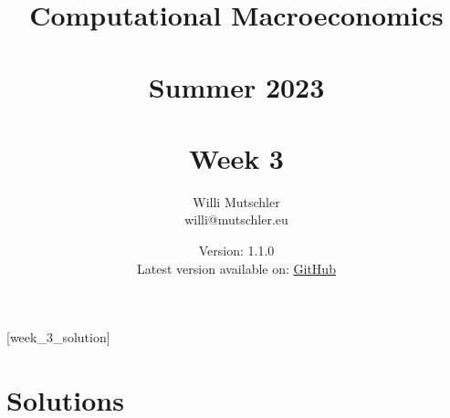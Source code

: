 
\newif\ifDisplaySolutions\DisplaySolutionstrue


\title{Computational Macroeconomics\\~\\Summer 2023\\~\\Week 3}
\author{Willi Mutschler\\willi@mutschler.eu}
\date{Version: 1.1.0\\Latest version available on: \href{https://github.com/wmutschl/Computational-Macroeconomics/releases/latest/download/week_3.pdf}{GitHub}}
\maketitle\thispagestyle{empty}

\newpage
{}[week_3_solution]
\tableofcontents\thispagestyle{empty}\newpage

\setcounter{page}{1}
\newpage
\newpage
\newpage
\newpage
\printbibliography
\newpage

\ifDisplaySolutions
\newpage
\appendix
\section{Solutions}

\fi
